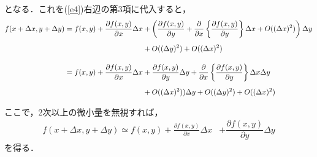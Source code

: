 となる．これを(\ref{e4})右辺の第3項に代入すると，
\begin{align}\label{e7}
f(x+\Delta x,y+\Delta y)
=f(x,y)+\frac{\partial f(x,y)}{\partial x}\Delta x&+
\left(\dfrac{\partial f(x,y)}{\partial y}+\frac{\partial }{\partial x}
\left\{
\dfrac{\partial f(x,y)}{\partial y}
\right\}
\Delta x+O((\Delta x)^2)\right)
\Delta y\notag\\[5pt]
&+O((\Delta y)^2)+O((\Delta x)^2)\notag\\[10pt]
%
=f(x,y)+\frac{\partial f(x,y)}{\partial x}\Delta x&+\dfrac{\partial f(x,y)}{\partial y}\Delta y+\frac{\partial }{\partial x}
\left\{
\dfrac{\partial f(x,y)}{\partial y}
\right\}\Delta x\Delta y\notag\\[5pt]
&
+O((\Delta x)^2))\Delta y+O((\Delta y)^2)+O((\Delta x)^2)\notag\\[5pt]
\end{align}
ここで，2次以上の微小量を無視すれば，
%
\begin{align}\label{e8}
f(x+\Delta x,y+\Delta y)
%
\simeq f(x,y)+\frac{\partial f(x,y)}{\partial x}\Delta x&+\dfrac{\partial f(x,y)}{\partial y}\Delta y
\end{align}
を得る．


